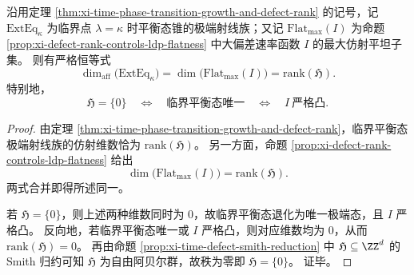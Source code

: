 \begin{theorem}\label{thm:xi-time-part9q-critical-flatness-holonomy-identity}
沿用定理 \ref{thm:xi-time-phase-transition-growth-and-defect-rank} 的记号，记 \(\mathrm{ExtEq}_{\kappa}\) 为临界点 \(\lambda=\kappa\) 时平衡态锥的极端射线族；又记 \(\mathrm{Flat}_{\max}(I)\) 为命题 \ref{prop:xi-defect-rank-controls-ldp-flatness} 中大偏差速率函数 \(I\) 的最大仿射平坦子集。
则有严格恒等式
\[
\dim_{\mathrm{aff}}\bigl(\mathrm{ExtEq}_{\kappa}\bigr)
=
\dim\bigl(\mathrm{Flat}_{\max}(I)\bigr)
=
\mathrm{rank}(\mathfrak H).
\]
特别地，
\[
\mathfrak H=\{0\}
\quad\Longleftrightarrow\quad
\text{临界平衡态唯一}
\quad\Longleftrightarrow\quad
I\ \text{严格凸}.
\]
\end{theorem}
\begin{proof}
由定理 \ref{thm:xi-time-phase-transition-growth-and-defect-rank}，临界平衡态极端射线族的仿射维数恰为 \(\mathrm{rank}(\mathfrak H)\)。
另一方面，命题 \ref{prop:xi-defect-rank-controls-ldp-flatness} 给出
\[
\dim\bigl(\mathrm{Flat}_{\max}(I)\bigr)=\mathrm{rank}(\mathfrak H).
\]
两式合并即得所述同一。

若 \(\mathfrak H=\{0\}\)，则上述两种维数同时为 \(0\)，故临界平衡态退化为唯一极端态，且 \(I\) 严格凸。
反向地，若临界平衡态唯一或 \(I\) 严格凸，则对应维数均为 \(0\)，从而 \(\mathrm{rank}(\mathfrak H)=0\)。
再由命题 \ref{prop:xi-time-defect-smith-reduction} 中 \(\mathfrak H\subseteq \ZZ^{d}\) 的 Smith 归约可知 \(\mathfrak H\) 为自由阿贝尔群，故秩为零即 \(\mathfrak H=\{0\}\)。
证毕。
\end{proof}

